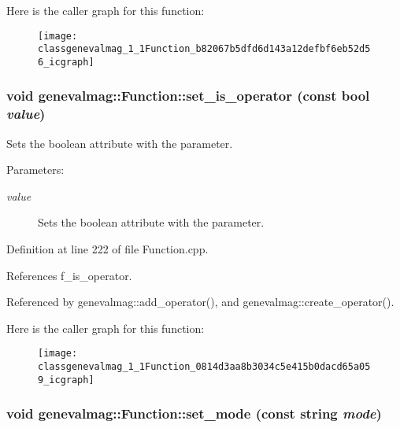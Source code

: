 Here is the caller graph for this function:\nopagebreak
\begin{figure}[H]
\begin{center}
\leavevmode
\texttt{[image: classgenevalmag\_1\_1Function\_b82067b5dfd6d143a12defbf6eb52d56\_icgraph]}
\end{center}
\end{figure}
\hypertarget{classgenevalmag_1_1Function_0814d3aa8b3034c5e415b0dacd65a059}{
\subsubsection[{set\_\-is\_\-operator}]{\setlength{\rightskip}{0pt plus 5cm}void genevalmag::Function::set\_\-is\_\-operator (const bool {\em value})}}
\label{classgenevalmag_1_1Function_0814d3aa8b3034c5e415b0dacd65a059}


Sets the boolean attribute with the parameter. \begin{Desc}
\item[Parameters:]
\begin{description}
\item[{\em value}]Sets the boolean attribute with the parameter. \end{description}
\end{Desc}


Definition at line 222 of file Function.cpp.

References f\_\-is\_\-operator.

Referenced by genevalmag::add\_\-operator(), and genevalmag::create\_\-operator().

Here is the caller graph for this function:\nopagebreak
\begin{figure}[H]
\begin{center}
\leavevmode
\texttt{[image: classgenevalmag\_1\_1Function\_0814d3aa8b3034c5e415b0dacd65a059\_icgraph]}
\end{center}
\end{figure}
\hypertarget{classgenevalmag_1_1Function_90ff82b99ca7a8bd4795a8c7b6a26ac9}{
\subsubsection[{set\_\-mode}]{\setlength{\rightskip}{0pt plus 5cm}void genevalmag::Function::set\_\-mode (const string {\em mode})}}
\label{classgenevalmag_1_1Function_90ff82b99ca7a8bd4795a8c7b6a26ac9}


